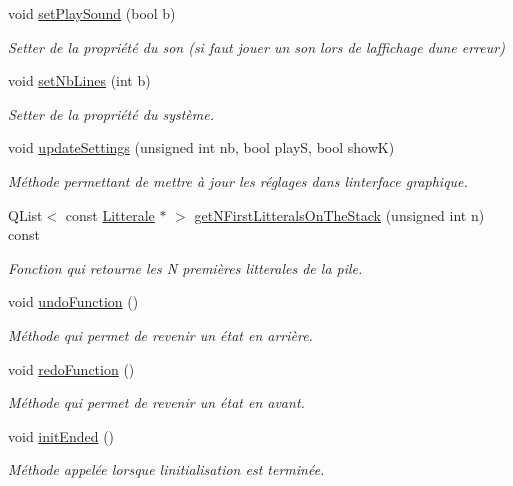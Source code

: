 \begin{DoxyCompactItemize}
void \hyperlink{class_controller_a98416fd659fe94cc653c20daa65153db}{set\+Play\+Sound} (bool b)
\begin{DoxyCompactList}\small\item\em Setter de la propriété du son (si faut jouer un son lors de l\textquotesingle{}affichage d\textquotesingle{}une erreur) \end{DoxyCompactList}\item 
void \hyperlink{class_controller_ad57e1e6dae948e21e181ca8a68ce3e07}{set\+Nb\+Lines} (int b)
\begin{DoxyCompactList}\small\item\em Setter de la propriété du système. \end{DoxyCompactList}\item 
void \hyperlink{class_controller_a343463d5b1cd37b9476589ff8a4f237f}{update\+Settings} (unsigned int nb, bool playS, bool showK)
\begin{DoxyCompactList}\small\item\em Méthode permettant de mettre à jour les réglages dans l\textquotesingle{}interface graphique. \end{DoxyCompactList}\item 
Q\+List$<$ const \hyperlink{class_litterale}{Litterale} $\ast$ $>$ \hyperlink{class_controller_a65ae9d86a62915750902efb9ac7392b0}{get\+N\+First\+Litterals\+On\+The\+Stack} (unsigned int n) const 
\begin{DoxyCompactList}\small\item\em Fonction qui retourne les N premières litterales de la pile. \end{DoxyCompactList}\item 
void \hyperlink{class_controller_aa84038a21ca561eed4abf1307e793595}{undo\+Function} ()\hypertarget{class_controller_aa84038a21ca561eed4abf1307e793595}{}\label{class_controller_aa84038a21ca561eed4abf1307e793595}

\begin{DoxyCompactList}\small\item\em Méthode qui permet de revenir un état en arrière. \end{DoxyCompactList}\item 
void \hyperlink{class_controller_a6436ff6f8a8fe6ba9fb3f208a7046aaa}{redo\+Function} ()\hypertarget{class_controller_a6436ff6f8a8fe6ba9fb3f208a7046aaa}{}\label{class_controller_a6436ff6f8a8fe6ba9fb3f208a7046aaa}

\begin{DoxyCompactList}\small\item\em Méthode qui permet de revenir un état en avant. \end{DoxyCompactList}\item 
void \hyperlink{class_controller_af223a8941aac0dcc2cf7d1328e2f2560}{init\+Ended} ()\hypertarget{class_controller_af223a8941aac0dcc2cf7d1328e2f2560}{}\label{class_controller_af223a8941aac0dcc2cf7d1328e2f2560}

\begin{DoxyCompactList}\small\item\em Méthode appelée lorsque l\textquotesingle{}initialisation est terminée. \end{DoxyCompactList}\end{DoxyCompactItemize}
